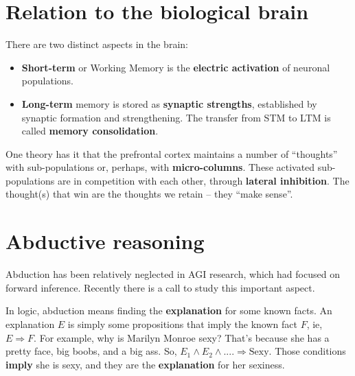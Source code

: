 \section{Relation to the biological brain}

There are two distinct aspects in the brain:
\begin{itemize}
	\item \textbf{Short-term} or Working Memory is the \textbf{electric activation} of neuronal populations.
	\item \textbf{Long-term} memory is stored as \textbf{synaptic strengths}, established by synaptic formation and strengthening.  The transfer from STM to LTM is called \textbf{memory consolidation}.
\end{itemize}

One theory has it that the prefrontal cortex maintains a number of ``thoughts'' with sub-populations or, perhaps, with \textbf{micro-columns}.  These activated sub-populations are in competition with each other, through \textbf{lateral inhibition}.  The thought(s) that win are the thoughts we retain -- they ``make sense''.

\section{Abductive reasoning}

Abduction has been relatively neglected in AGI research, which had focused on forward inference.  Recently there is a call to study this important aspect.

In logic, abduction means finding the \textbf{explanation} for some known facts.  An explanation $E$ is simply some propositions that imply the known fact $F$, ie, $E \Rightarrow F$.  For example, why is Marilyn Monroe sexy?  That's because she has a pretty face, big boobs, and a big ass.  So, $E_1 \wedge E_2 \wedge .... \Rightarrow \mathrm{Sexy}$.  Those conditions \textbf{imply} she is sexy, and they are the \textbf{explanation} for her sexiness.


